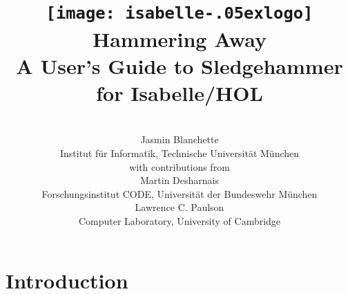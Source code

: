 \documentclass[a4paper,12pt]{article}
\renewcommand\_{\hbox{\textunderscore\kern-.05ex}}
\begin{document}
\renewcommand\labelitemi{\raise.065ex\hbox{\small\textbullet}}

\title{\texttt{[image: isabelle\_logo]} \\[4ex]
Hammering Away \\[\smallskipamount]
\Large A User's Guide to Sledgehammer for Isabelle/HOL}
\author{\hbox{} \\
Jasmin Blanchette \\
{\normalsize Institut f\"ur Informatik, Technische Universit\"at M\"unchen} \\[4\smallskipamount]
{\normalsize with contributions from} \\[4\smallskipamount]
Martin Desharnais \\
{\normalsize Forschungsinstitut CODE, Universit\"at der Bundeswehr M\"unchen}  \\[4\smallskipamount]
Lawrence C. Paulson \\
{\normalsize Computer Laboratory, University of Cambridge} \\
\hbox{}}

\maketitle

\tableofcontents

\setlength{\parskip}{.7em plus .2em minus .1em}
\setlength{\parindent}{0pt}
\setlength{\abovedisplayskip}{\parskip}
\setlength{\abovedisplayshortskip}{.9\parskip}
\setlength{\belowdisplayskip}{\parskip}
\setlength{\belowdisplayshortskip}{.9\parskip}

\newenvironment{enum}%
    {\begin{list}{}{%
        \setlength{\topsep}{.1\parskip}%
        \setlength{\partopsep}{.1\parskip}%
        \setlength{\itemsep}{\parskip}%
        \advance\itemsep by-\parsep}}
    {\end{list}}

\def\pre{\begingroup\vskip0pt plus1ex\advance\leftskip by\leftmargin
\advance\rightskip by\leftmargin}
\def\post{\vskip0pt plus1ex\endgroup}

\def\prew{\pre\advance\rightskip by-\leftmargin}
\def\postw{\post}


\section{Introduction}
\label{introduction}
\end{document}
